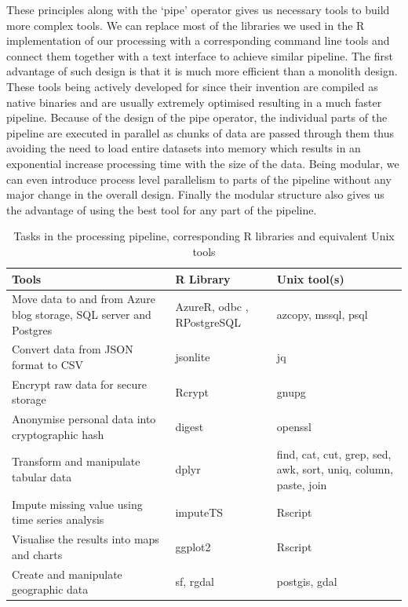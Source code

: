These principles along with the `pipe' operator gives us necessary tools to build more complex tools.
We can replace most of the libraries we used in the R implementation of our processing with a corresponding command line tools and connect them together with a text interface to achieve similar pipeline.
The first advantage of such design is that it is much more efficient than a monolith design.
These tools being actively developed for since their invention are compiled as native binaries and are usually extremely optimised resulting in a much faster pipeline.
Because of the design of the pipe operator, the individual parts of the pipeline are executed in parallel as chunks of data are passed through them thus avoiding the need to load entire datasets into memory which results in an exponential increase processing time with the size of the data.
Being modular, we can even introduce process level parallelism to parts of the pipeline without any major change in the overall design.
Finally the modular structure also gives us the advantage of using the best tool for any part of the pipeline.

\begin{table}[h]
  \footnotesize
  \begin{center}
    \begin{tabular}{p{4cm}p{3cm}p{3cm}}
      \toprule
      Tools & R Library & Unix tool(s)\\
      \midrule
        Move data to and from Azure blog storage, SQL server and Postgres & AzureR, odbc , RPostgreSQL & azcopy, mssql, psql\\
				Convert data from JSON format to CSV & jsonlite & jq\\
        \addlinespace[0.2cm]
				Encrypt raw data for secure storage & Rcrypt & gnupg\\
        \addlinespace[0.2cm]
				Anonymise personal data into cryptographic hash & digest & openssl\\
        \addlinespace[0.2cm]
				Transform and manipulate tabular data& dplyr & find, cat, cut, grep, sed, awk, sort, uniq, column, paste, join\\
        \addlinespace[0.2cm]
				Impute missing value using time series analysis & imputeTS & Rscript\\
        \addlinespace[0.2cm]
				Visualise the results into maps and charts & ggplot2 & Rscript\\
        \addlinespace[0.2cm]
        Create and manipulate geographic data & sf, rgdal & postgis, gdal\\
      \bottomrule
    \end{tabular}
  \end{center}
  \caption{Tasks in the processing pipeline, corresponding R libraries and equivalent Unix tools}
  \label{table:toolkit:tools}
\end{table}

